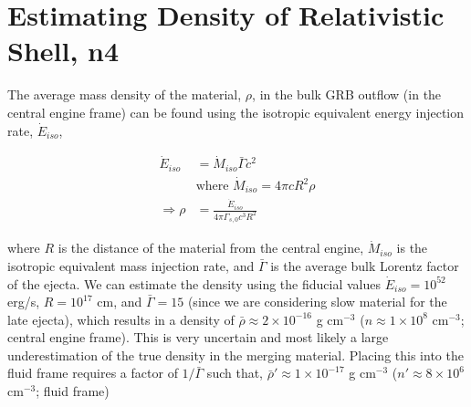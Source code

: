 \documentclass[linenumbers,twocolumn]{aastex631}
\begin{document}
\section{Estimating Density of Relativistic Shell, n4}
{
    The average mass density of the material, $\rho$, in the bulk GRB outflow (in the central engine frame) can be found using the isotropic equivalent energy injection rate, $\dot{E}_{iso}$, 

    \begin{align}
    \dot{E}_{iso} &= \dot{M}_{iso} \bar{\Gamma} c^2\\
    &\text{where } \dot{M}_{iso} = 4 \pi c R^2 \rho\\
    \Rightarrow \rho &= \frac{\dot{E}_{iso}}{4\pi \Gamma_{s,0} c^3 R^2}
    \end{align}

    where $R$ is the distance of the material from the central engine, $\dot{M}_{iso}$ is the isotropic equivalent mass injection rate, and $\bar{\Gamma}$ is the average bulk Lorentz factor of the ejecta. We can estimate the density using the fiducial values $\dot{E}_{iso} = 10^{52}$ erg/s, $R=10^{17}$ cm, and $\bar{\Gamma} = 15$ (since we are considering slow material for the late ejecta), which results in a density of $\bar{\rho}\approx 2\times10^{-16}$ g cm$^{-3}$ ($n \approx 1\times 10^{8}$ cm$^{-3}$; central engine frame). This is very uncertain and most likely a large underestimation of the true density in the merging material. Placing this into the fluid frame requires a factor of $1/\bar{\Gamma}$ such that, $\bar{\rho}'\approx 1\times10^{-17}$ g cm$^{-3}$ ($n' \approx 8\times 10^{6}$ cm$^{-3}$; fluid frame)
}
\end{document}
